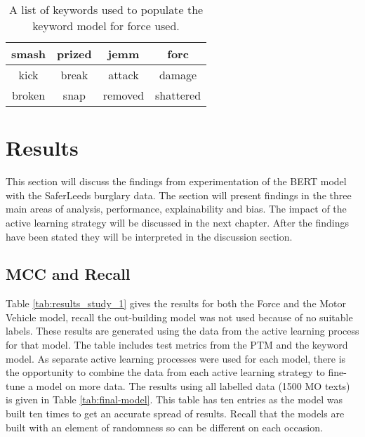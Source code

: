 \begin{table}[]
\begin{tabular}{|c|c|c|c|}
\hline
smash  & prized & jemm    & forc      \\ \hline
kick   & break  & attack  & damage    \\ \hline
broken & snap   & removed & shattered \\ \hline
\end{tabular}
\caption[Keywords for keyword model - force used]{\label{tab:Keywords_force} A list of keywords used to populate the keyword model for force used.}
\end{table}





   

\section{Results} This section will discuss the findings from experimentation of the BERT model with the SaferLeeds burglary data. The section will present findings in the three main areas of analysis, performance, explainability and bias. The impact of the active learning strategy will be discussed in the next chapter. After the findings have been stated they will be interpreted in the discussion section.



\subsection{MCC and Recall} Table \ref{tab:results_study_1} gives the results for both the Force and the Motor Vehicle model, recall the out-building model was not used because of no suitable labels. These results are generated using the data from the active learning process for that model. The table includes test metrics from the PTM and the keyword model. As separate active learning processes were used for each model, there is the opportunity to combine the data from each active learning strategy to fine-tune a model on more data. The results using all labelled data (1500 MO texts) is given in Table \ref{tab:final-model}. This table has ten entries as the model was built ten times to get an accurate spread of results. Recall that the models are built with an element of randomness so can be different on each occasion.


